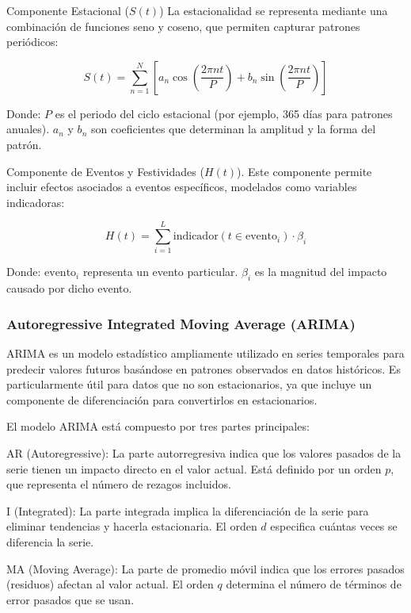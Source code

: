 Componente Estacional (\( S(t) \))
La estacionalidad se representa mediante una combinación de funciones seno y coseno, que permiten capturar patrones periódicos:

\begin{equation}
S(t) = \sum_{n=1}^{N} \left[ a_n \cos\left(\frac{2 \pi n t}{P}\right) + b_n \sin\left(\frac{2 \pi n t}{P}\right) \right]
\end{equation}

Donde:
\( P \) es el periodo del ciclo estacional (por ejemplo, 365 días para patrones anuales).
\( a_n \) y \( b_n \) son coeficientes que determinan la amplitud y la forma del patrón.

Componente de Eventos y Festividades (\( H(t) \)). 
Este componente permite incluir efectos asociados a eventos específicos, modelados como variables indicadoras:

\begin{equation}
H(t) = \sum_{i=1}^{L} \text{indicador}(t \in \text{evento}_i) \cdot \beta_i
\end{equation}

Donde:
\( \text{evento}_i \) representa un evento particular.
\( \beta_i \) es la magnitud del impacto causado por dicho evento.

\subsubsection{Autoregressive Integrated Moving Average (ARIMA)}

ARIMA es un modelo estadístico ampliamente utilizado en series temporales para predecir valores futuros basándose en patrones observados en datos históricos. Es particularmente útil para datos que no son estacionarios, ya que incluye un componente de diferenciación para convertirlos en estacionarios.

El modelo ARIMA está compuesto por tres partes principales:

AR (Autoregressive): La parte autorregresiva indica que los valores pasados de la serie tienen un impacto directo en el valor actual. Está definido por un orden \( p \), que representa el número de rezagos incluidos.

I (Integrated): La parte integrada implica la diferenciación de la serie para eliminar tendencias y hacerla estacionaria. El orden \( d \) especifica cuántas veces se diferencia la serie.

MA (Moving Average): La parte de promedio móvil indica que los errores pasados (residuos) afectan al valor actual. El orden \( q \) determina el número de términos de error pasados que se usan.

